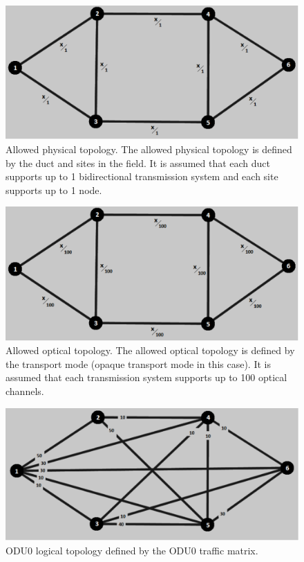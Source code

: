 \begin{figure}[H]
\centering
\includegraphics[width=13cm]{sdf/heuristic/opaque_survivability/figures/allowed_physical}
\caption{Allowed physical topology. The allowed physical topology is defined by the duct and sites in the field. It is assumed that each duct supports up to 1 bidirectional transmission system and each site supports up to 1 node.}
\label{allowed_physical_surv_ref_medium_heuristic}
\end{figure}

\begin{figure}[H]
\centering
\includegraphics[width=13cm]{sdf/heuristic/opaque_survivability/figures/allowed_optical}
\caption{Allowed optical topology. The allowed optical topology is defined by the transport mode (opaque transport mode in this case). It is assumed that each transmission system supports up to 100 optical channels.}
\label{allowed_optical_surv_ref_medium_heuristic}
\end{figure}

\begin{figure}[H]
\centering
\includegraphics[width=13cm]{sdf/heuristic/opaque_survivability/figures/logical_topology_odu0_medium}
\caption{ODU0 logical topology defined by the ODU0 traffic matrix.}
\label{logical_ODU0_surv_ref_medium_heuristic}
\end{figure}

